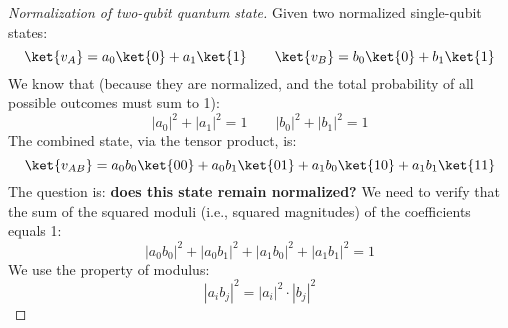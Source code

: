 \begin{proof}[Normalization of two-qubit quantum state]
    Given two normalized single-qubit states:
    \begin{equation*}
        \ket{v_{A}} = a_{0} \ket{0} + a_{1} \ket{1} \hspace{2em} \ket{v_{B}} = b_{0} \ket{0} + b_{1} \ket{1}
    \end{equation*}
    We know that (because they are normalized, and the total probability of all possible outcomes must sum to 1):
    \begin{equation*}
        \left|a_{0}\right|^{2} + \left|a_{1}\right|^{2} = 1 \hspace{2em} \left|b_{0}\right|^{2} + \left|b_{1}\right|^{2} = 1
    \end{equation*}
    The combined state, via the tensor product, is:
    \begin{equation*}
        \ket{v_{AB}} =  a_{0}b_{0}\ket{00} + a_{0}b_{1}\ket{01} + a_{1}b_{0}\ket{10} + a_{1}b_{1}\ket{11}
    \end{equation*}
    The question is: \textbf{does this state remain normalized?} We need to verify that the sum of the squared moduli (i.e., squared magnitudes) of the coefficients equals 1:
    \begin{equation*}
        \left|a_{0}b_{0}\right|^{2} + \left|a_{0}b_{1}\right|^{2} + \left|a_{1}b_{0}\right|^{2} + \left|a_{1}b_{1}\right|^{2} = 1
    \end{equation*}
    We use the property of modulus:
    \begin{equation*}
        \left|a_{i}b_{j}\right|^{2} = \left|a_{i}\right|^{2} \cdot \left|b_{j}\right|^{2}
    \end{equation*}

    \newpage


\end{proof}
